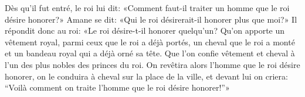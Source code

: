 Dès qu’il fut entré, le roi lui dit:
	«Comment faut-il traiter un homme que le roi désire honorer?»
	Amane se dit: «Qui le roi désirerait-il honorer plus que moi?»
Il répondit donc au roi: «Le roi désire-t-il honorer quelqu’un?
	Qu’on apporte un vêtement royal, parmi ceux que le roi a déjà portés,
	un cheval que le roi a monté et un bandeau royal qui a déjà orné sa tête.
Que l’on confie vêtement et cheval à l’un des plus nobles des princes du roi.
On revêtira alors l’homme que le roi désire honorer,
	on le conduira à cheval sur la place de la ville,
	et devant lui on criera:
	“Voilà comment on traite l’homme que le roi désire honorer!”»
